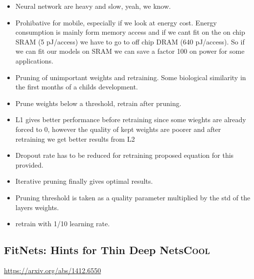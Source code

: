 \documentclass[11pt]{article}
\begin{document}
\begin{itemize}
\item Neural network are heavy and slow, yeah, we know.
\item Prohibative for mobile, especially if we look at energy cost. Energy consumption is mainly form memory access and if we cant fit on the on chip SRAM (5 pJ/access) we have to go to off chip DRAM (640 pJ/access). So if we can fit our models on SRAM we can save a factor 100 on power for some applications.
\item Pruning of unimportant weights and retraining. Some biological similarity in the first months of a childs development.
\item Prune weights below a threshold, retrain after pruning.
\item L1 gives better performance before retraining since some wieghts are already forced to 0, however the quality of kept weights are poorer and after retraining we get better results from L2
\item Dropout rate has to be reduced for retraining proposed equation for this provided.
\item Iterative pruning finally gives optimal results.
\item Pruning threshold is taken as a quality parameter multiplied by the std of the layers weights.
\item retrain with 1/10 learning rate.
\end{itemize}

\subsection{FitNets: Hints for Thin Deep Nets\hfill{}\textsc{Cool}}
\label{sec:orgb8253d6}
\url{https://arxiv.org/abs/1412.6550}
\end{document}
